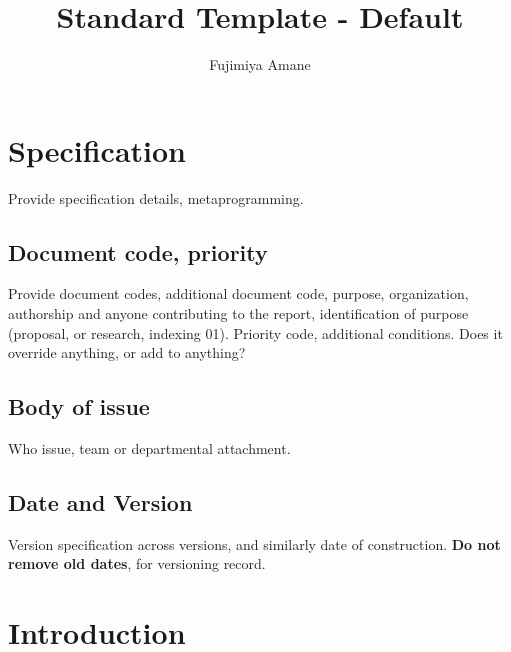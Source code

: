 \documentclass[10pt,a4paper]{article}
\title{\textbf{Standard Template - Default}} %
\author{Fujimiya Amane} %
\affiliation{} %
\begin{document}
\maketitle

\begin{abstract}
    \noindent
    \blindtext[1]

\end{abstract}

\vspace{2.5cm}



\thispagestyle{firstpage}

\pagebreak


\newgeometry{} %

\setcounter{section}{-1}

\section{Specification}
\label{sec:spec}

Provide specification details, metaprogramming. 

\subsection{Document code, priority}

Provide document codes, additional document code, purpose, organization, authorship and anyone contributing to the report, identification of purpose (proposal, or research, indexing 01). Priority code, additional conditions. Does it override anything, or add to anything?

\subsection{Body of issue}

Who issue, team or departmental attachment. 

\subsection{Date and Version}

Version specification across versions, and similarly date of construction. \textbf{Do not remove old dates}, for versioning record. 

\section{Introduction}
\end{document}
